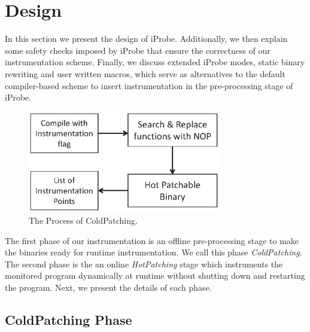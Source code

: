 
\section{Design}
\label{sec:iprobeDesign}

In this section we present the design of iProbe.
Additionally, we then explain some safety checks imposed by iProbe that ensure the correctness of our instrumentation scheme. 
Finally, we discuss extended iProbe modes, static binary rewriting and user written macros, which serve as alternatives to the default compiler-based scheme to insert instrumentation in the pre-processing stage of iProbe.

\begin{figure}[t]
  \begin{center}
    \includegraphics[width=0.75\textwidth]{iprobe/Images/coldpatch.eps}
    \caption{The Process of ColdPatching.}
    \label{fig:coldpatch}
  \end{center}
\end{figure}

The first phase of our instrumentation is an offline pre-processing stage to make the binaries ready for runtime instrumentation. We call this phase \emph{ColdPatching}. 
The second phase is the an online \emph{HotPatching} stage which instruments the monitored program dynamically at runtime without shutting down and restarting the program. 
Next, we present the details of each phase.


\subsection{ColdPatching Phase}
\label{sec:coldpatch}


